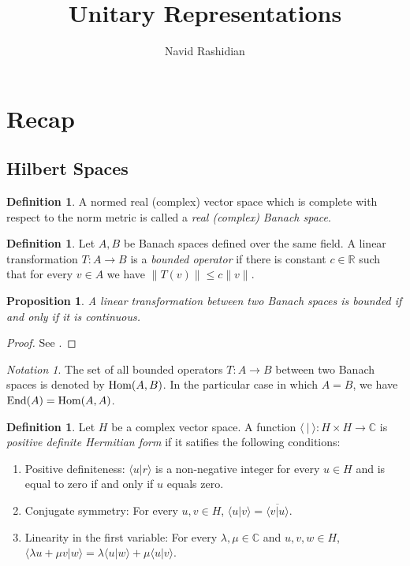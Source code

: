\documentclass[12pt]{article}
\title{Unitary Representations}
\author{Navid Rashidian}
\date{}
\newtheorem{prop}[thm]{Proposition}
\theoremstyle{definition}
\newtheorem{dfn}[thm]{Definition}
\theoremstyle{remark}
\newtheorem{notation}[thm]{Notation}
\newcommand{\Comp}{\mathbb{C}}
\newcommand{\Real}{\mathbb{R}}
\newcommand{\Hom}[2]{\textup{Hom}(#1,#2)}
\newcommand{\End}[1]{\textup{End}(#1)}
\begin{document}
    \maketitle

    \section{Recap}

    \subsection{Hilbert Spaces}

    \begin{dfn}
        A normed real (complex) vector space which is complete with respect to the norm metric is called a \emph{real (complex) Banach space}.
    \end{dfn}

    \begin{dfn}
        Let $A,B$ be Banach spaces defined over the same field. A linear transformation $T\colon A\to B$ is a \emph{bounded operator} if there is constant $c\in\Real$ such that for every $v\in A$ we have $\|T(v)\|\leq c\|v\|$.
    \end{dfn}

    \begin{prop}
        A linear transformation between two Banach spaces is bounded if and only if it is continuous.
    \end{prop}

    \begin{proof}
        See \cite[Ch. II, Prop. 1.1]{Conway1985}.
    \end{proof}

    \begin{notation}
        The set of all bounded operators $T\colon A\to B$ between two Banach spaces is denoted by $\Hom{A}{B}$. In the particular case in which $A=B$, we have $\End{A}=\Hom{A}{A}$.
    \end{notation}

    \begin{dfn}
        Let $H$ be a complex vector space. A function $\langle\ |\ \rangle\colon H\times H\to\Comp$ is \emph{positive definite Hermitian form} if it satifies the following conditions:
        \begin{enumerate}
            \item Positive definiteness: $\langle u|r\rangle$ is a non-negative integer for every $u\in H$ and is equal to zero if and only if $u$ equals zero.
            \item Conjugate symmetry: For every $u,v\in H$, $\langle u|v\rangle = \overline{\langle v|u \rangle}$.
            \item Linearity in the first variable: For every $\lambda,\mu\in\Comp$ and $u,v,w\in H$, $\langle\lambda u+\mu v|w\rangle=\lambda\langle u|w\rangle+\mu\langle u|v\rangle$.
        \end{enumerate}
    \end{dfn}
    
\end{document}
